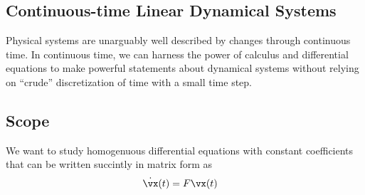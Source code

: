 \documentclass[a4paper,11pt]{exam}
\newcounter{ct}
\begin{document}
\begin{questions}


\newpage
\section{Continuous-time Linear Dynamical Systems}
Physical systems are unarguably well described by changes through continuous time.
In continuous time, we can harness the power of calculus and differential equations to make powerful statements about dynamical systems without relying on ``crude'' discretization of time with a small time step.

\subsection{Scope}
We want to study homogenuous differential equations with constant coefficients that can be written succintly in matrix form as
\begin{align}
    \dot{\vx}(t) &= F \vx(t)
\end{align}

\end{questions}
\end{document}

